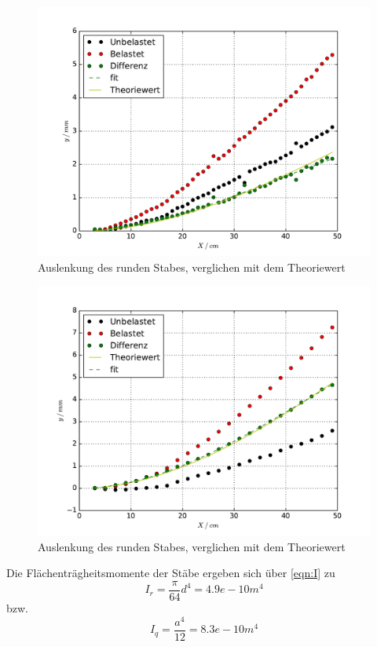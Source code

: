 \begin{figure}
  \centering
  \includegraphics[width = \textwidth]{./Plots/Reihe1.pdf}
  \caption{Auslenkung des runden Stabes, verglichen mit dem Theoriewert}
  \label{fig:Reihe1}
\end{figure}

\begin{figure}
  \centering
  \includegraphics[width = \textwidth]{./Plots/Reihe2.pdf}
  \caption{Auslenkung des runden Stabes, verglichen mit dem Theoriewert}
  \label{fig:Reihe2}
\end{figure}

Die Flächenträgheitsmomente der Stäbe ergeben sich über \eqref{eqn:I} zu
\begin{equation}
  I_r = \frac{\pi}{64}d^4 = 4.9e-10 m^4
\end{equation}
bzw.
\begin{equation}
  I_q = \frac{a^4}{12} = 8.3e-10 m^4
\end{equation}

